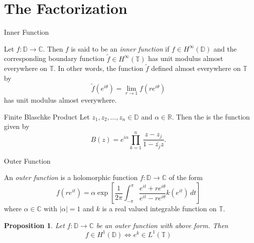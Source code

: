 \documentclass{beamer}
\newtheorem{proposition}[theorem]{Proposition}
\numberwithin{equation}{subsection}
\newcommand{\R}{\mathbb R}
\newcommand{\C}{\mathbb C}
\newcommand{\D}{\mathbb D}
\newcommand{\T}{\mathbb T}
\newcommand{\abs}[1]{\left\lvert #1 \right\rvert}
\begin{document}
\section{The Factorization}
\begin{frame}{Inner Function}
    \pause
	\begin{definition}
    Let $f: \D \to \C$. Then $f$ is said to be an \textit{inner function} if $f\in H^{\infty} \left( \D \right)$ and the corresponding boundary function $\tilde{f} \in H^{\infty} \left( \T \right)$ has unit modulus almost everywhere on $\T$. In other words, the function $\tilde{f}$ defined almost everywhere on $\T$ by
    \begin{equation*}
	\tilde{f} \left( e^{i\theta} \right) = \lim_{r\to 1} f\left( re^{i\theta} \right)
    \end{equation*}
    has unit modulus almost everywhere.
\end{definition}
    
    \pause

    \begin{exampleblock}{Finite Blaschke Product}
    Let $z_{1}, z_{2}, \ldots, z_{n} \in \D$ and $\alpha \in \R$. Then the  is the function given by 
    \begin{equation*}
	B\left( z \right) = e^{i\alpha} \prod_{k=1}^{n} \frac{z-z_{j}}{1-\bar{z_{j}}z}.
    \end{equation*}
\end{exampleblock}
\end{frame}

\begin{frame}{Outer Function}
    \begin{definition}
	An \textit{outer function} is a holomorphic function $f: \D \to \C$ of the form 
	\begin{equation*}
	    f\left( re^{it} \right) = \alpha \exp\left[ \frac{1}{2\pi} \int_{-\pi}^{\pi} \frac{e^{it} + re^{i\theta}}{e^{it}-re^{i\theta}} k\left( e^{it} \right)\, dt \right]
	\end{equation*}
	where $\alpha \in \C$ with $\abs{\alpha}=1$ and $k$ is a real valued integrable function on $\T$.
    \end{definition}

    \pause

    \begin{proposition}
	Let $f: \D \to \C$ be an outer function with above form. Then 
	\begin{equation*}
	    f \in H^{1} \left( \D \right) \Leftrightarrow e^{k} \in L^{1} \left( \T \right)
	\end{equation*}
    \end{proposition}
\end{frame}
\end{document}
